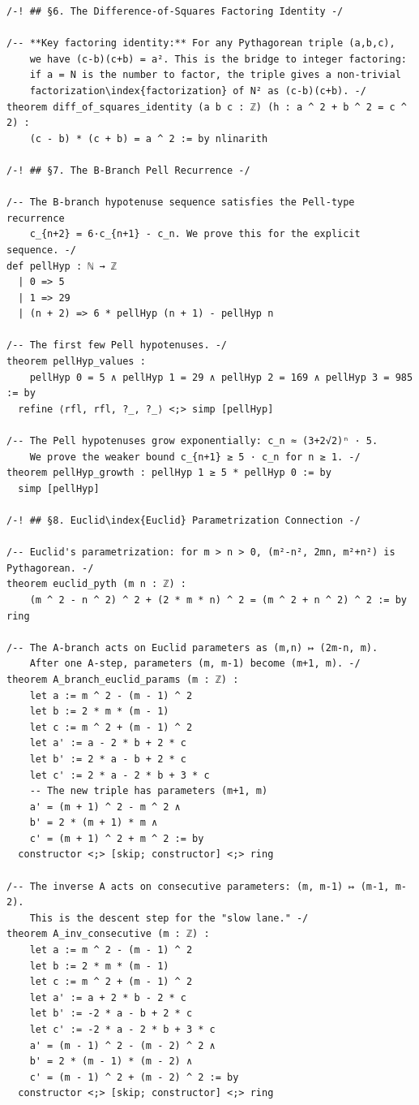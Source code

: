 \documentclass[11pt,openany]{book}
\theoremstyle{definition}
\theoremstyle{plain}
\theoremstyle{remark}
\begin{document}
\begin{lstlisting}[style=lean]
/-! ## §6. The Difference-of-Squares Factoring Identity -/

/-- **Key factoring identity:** For any Pythagorean triple (a,b,c),
    we have (c-b)(c+b) = a². This is the bridge to integer factoring:
    if a = N is the number to factor, the triple gives a non-trivial
    factorization\index{factorization} of N² as (c-b)(c+b). -/
theorem diff_of_squares_identity (a b c : ℤ) (h : a ^ 2 + b ^ 2 = c ^ 2) :
    (c - b) * (c + b) = a ^ 2 := by nlinarith

/-! ## §7. The B-Branch Pell Recurrence -/

/-- The B-branch hypotenuse sequence satisfies the Pell-type recurrence
    c_{n+2} = 6·c_{n+1} - c_n. We prove this for the explicit sequence. -/
def pellHyp : ℕ → ℤ
  | 0 => 5
  | 1 => 29
  | (n + 2) => 6 * pellHyp (n + 1) - pellHyp n

/-- The first few Pell hypotenuses. -/
theorem pellHyp_values :
    pellHyp 0 = 5 ∧ pellHyp 1 = 29 ∧ pellHyp 2 = 169 ∧ pellHyp 3 = 985 := by
  refine ⟨rfl, rfl, ?_, ?_⟩ <;> simp [pellHyp]

/-- The Pell hypotenuses grow exponentially: c_n ≈ (3+2√2)ⁿ · 5.
    We prove the weaker bound c_{n+1} ≥ 5 · c_n for n ≥ 1. -/
theorem pellHyp_growth : pellHyp 1 ≥ 5 * pellHyp 0 := by
  simp [pellHyp]

/-! ## §8. Euclid\index{Euclid} Parametrization Connection -/

/-- Euclid's parametrization: for m > n > 0, (m²-n², 2mn, m²+n²) is Pythagorean. -/
theorem euclid_pyth (m n : ℤ) :
    (m ^ 2 - n ^ 2) ^ 2 + (2 * m * n) ^ 2 = (m ^ 2 + n ^ 2) ^ 2 := by ring

/-- The A-branch acts on Euclid parameters as (m,n) ↦ (2m-n, m).
    After one A-step, parameters (m, m-1) become (m+1, m). -/
theorem A_branch_euclid_params (m : ℤ) :
    let a := m ^ 2 - (m - 1) ^ 2
    let b := 2 * m * (m - 1)
    let c := m ^ 2 + (m - 1) ^ 2
    let a' := a - 2 * b + 2 * c
    let b' := 2 * a - b + 2 * c
    let c' := 2 * a - 2 * b + 3 * c
    -- The new triple has parameters (m+1, m)
    a' = (m + 1) ^ 2 - m ^ 2 ∧
    b' = 2 * (m + 1) * m ∧
    c' = (m + 1) ^ 2 + m ^ 2 := by
  constructor <;> [skip; constructor] <;> ring

/-- The inverse A acts on consecutive parameters: (m, m-1) ↦ (m-1, m-2).
    This is the descent step for the "slow lane." -/
theorem A_inv_consecutive (m : ℤ) :
    let a := m ^ 2 - (m - 1) ^ 2
    let b := 2 * m * (m - 1)
    let c := m ^ 2 + (m - 1) ^ 2
    let a' := a + 2 * b - 2 * c
    let b' := -2 * a - b + 2 * c
    let c' := -2 * a - 2 * b + 3 * c
    a' = (m - 1) ^ 2 - (m - 2) ^ 2 ∧
    b' = 2 * (m - 1) * (m - 2) ∧
    c' = (m - 1) ^ 2 + (m - 2) ^ 2 := by
  constructor <;> [skip; constructor] <;> ring


\end{lstlisting}
\end{document}
